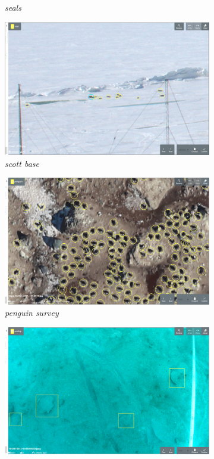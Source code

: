 \begin{figure}[h!]
\begin{subfigure}[t]{0.24\linewidth}
  \caption{\emph{seals}}
\end{subfigure}%
\begin{subfigure}[t]{0.24\linewidth}
  \includegraphics[width=1.0\linewidth]{figures/annotation/screenshots/scott_base_sunny.png}
  \caption{\emph{scott base}}
\end{subfigure}
\begin{subfigure}[t]{0.24\linewidth}
  \includegraphics[width=1.0\linewidth]{figures/annotation/screenshots/penguins_aerial2.png}
  \caption{\emph{penguin survey}}
\end{subfigure}%
\begin{subfigure}[t]{0.24\linewidth}
  \includegraphics[width=1.0\linewidth]{figures/annotation/screenshots/scallops4.png}

\end{subfigure}
\end{figure}
